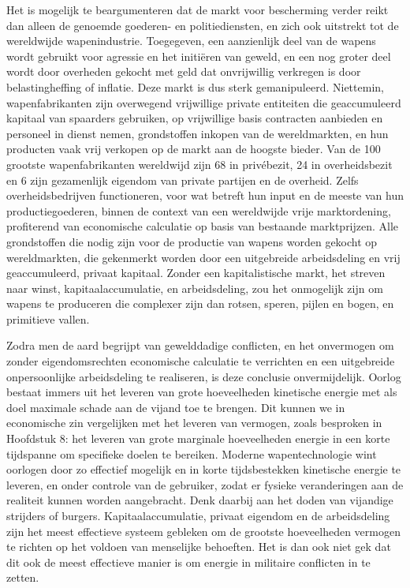 Het is mogelijk te beargumenteren dat de markt voor bescherming verder reikt dan alleen de genoemde goederen- en politiediensten, en zich ook uitstrekt tot de wereldwijde wapenindustrie. Toegegeven, een aanzienlijk deel van de wapens wordt gebruikt voor agressie en het initiëren van geweld, en een nog groter deel wordt door overheden gekocht met geld dat onvrijwillig verkregen is door belastingheffing of inflatie. Deze markt is dus sterk gemanipuleerd. Niettemin, wapenfabrikanten zijn overwegend vrijwillige private entiteiten die geaccumuleerd kapitaal van spaarders gebruiken, op vrijwillige basis contracten aanbieden en personeel in dienst nemen, grondstoffen inkopen van de wereldmarkten, en hun producten vaak vrij verkopen op de markt aan de hoogste bieder. Van de 100 grootste wapenfabrikanten wereldwijd zijn 68 in privébezit, 24 in overheidsbezit en 6 zijn gezamenlijk eigendom van private partijen en de overheid.\autocite{199} Zelfs overheidsbedrijven functioneren, voor wat betreft hun input en de meeste van hun productiegoederen, binnen de context van een wereldwijde vrije marktordening, profiterend van economische calculatie op basis van bestaande marktprijzen. Alle grondstoffen die nodig zijn voor de productie van wapens worden gekocht op wereldmarkten, die gekenmerkt worden door een uitgebreide arbeidsdeling en vrij geaccumuleerd, privaat kapitaal. Zonder een kapitalistische markt, het streven naar winst, kapitaalaccumulatie, en arbeidsdeling, zou het onmogelijk zijn om wapens te produceren die complexer zijn dan rotsen, speren, pijlen en bogen, en primitieve vallen.

Zodra men de aard begrijpt van gewelddadige conflicten, en het onvermogen om zonder eigendomsrechten economische calculatie te verrichten en een uitgebreide onpersoonlijke arbeidsdeling te realiseren, is deze conclusie onvermijdelijk. Oorlog bestaat immers uit het leveren van grote hoeveelheden kinetische energie met als doel maximale schade aan de vijand toe te brengen. Dit kunnen we in economische zin vergelijken met het leveren van vermogen, zoals besproken in Hoofdstuk 8: het leveren van grote marginale hoeveelheden energie in een korte tijdspanne om specifieke doelen te bereiken. Moderne wapentechnologie wint oorlogen door zo effectief mogelijk en in korte tijdsbestekken kinetische energie te leveren, en onder controle van de gebruiker, zodat er fysieke veranderingen aan de realiteit kunnen worden aangebracht. Denk daarbij aan het doden van vijandige strijders of burgers. Kapitaalaccumulatie, privaat eigendom en de arbeidsdeling zijn het meest effectieve systeem gebleken om de grootste hoeveelheden vermogen te richten op het voldoen van menselijke behoeften. Het is dan ook niet gek dat dit ook de meest effectieve manier is om energie in militaire conflicten in te zetten.

